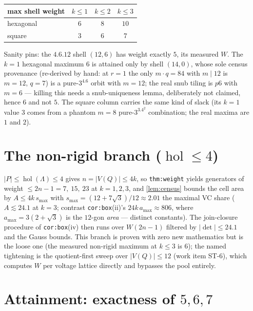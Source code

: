 \documentclass[11pt,a4paper,oneside]{article}
\theoremstyle{plain}
\theoremstyle{definition}
\theoremstyle{remark}
\DeclareMathOperator{\hol}{hol}
\begin{document}
\begin{center}
\begin{tabular}{lccc}
\toprule
max shell weight & $k \le 1$ & $k \le 2$ & $k \le 3$\\
\midrule
hexagonal & $6$ & $8$ & $10$\\
square & $3$ & $6$ & $7$\\
\bottomrule
\end{tabular}
\end{center}

Sanity pins: the $4.6.12$ shell $(12,6)$ has weight exactly $5$, its measured $W$. The
$k{=}1$ hexagonal maximum $6$ is attained only by shell $(14,0)$, whose sole census
provenance (re-derived by hand: at $r{=}1$ the only $m\cdot q = 84$ with $m \mid 12$ is
$m = 12$, $q = 7$) is a pure-$3^4.6$ orbit with $m = 12$; the real snub tiling is $p6$ with
$m = 6$ --- killing this needs a snub-uniqueness lemma, deliberately not claimed, hence $6$
and not $5$. The square column carries the same kind of slack (its $k{=}1$ value $3$
comes from a phantom $m{=}8$ pure-$3^3.4^2$ combination; the real maxima are $1$ and $2$).

\section{The non-rigid branch ($\hol \le 4$)}\label{sec:nonrigid}

$|P| \le \hol(\Lambda) \le 4$ gives $n = |V(Q)| \le 4k$, so \texttt{thm:weight} yields
generators of weight $\le 2n - 1 = 7,\ 15,\ 23$ at $k = 1, 2, 3$, and \cref{lem:census}
bounds the cell area by $A \le 4k\,s_{\max}$ with $s_{\max} = (12+7\sqrt3)/12 \approx 2.01$
the maximal VC share ($A \lesssim 24.1$ at $k = 3$; contrast \texttt{cor:box}(ii)'s
$24k\,a_{\max} \approx 806$, where $a_{\max} = 3(2{+}\sqrt3)$ is the $12$-gon \emph{area} ---
distinct constants). The join-closure procedure of \texttt{cor:box}(iv) then runs over
$W(2n{-}1)$ filtered by $|{\det}| \le 24.1$ and the Gauss bounds. This branch is proven with
zero new mathematics but is the loose one (the measured non-rigid maximum at $k \le 3$ is
$6$); the named tightening is the quotient-first sweep over $|V(Q)| \le 12$ (work item
ST-6), which computes $W$ per voltage lattice directly and bypasses the pool entirely.

\section{Attainment: exactness of $5, 6, 7$}\label{sec:attain}
\end{document}

